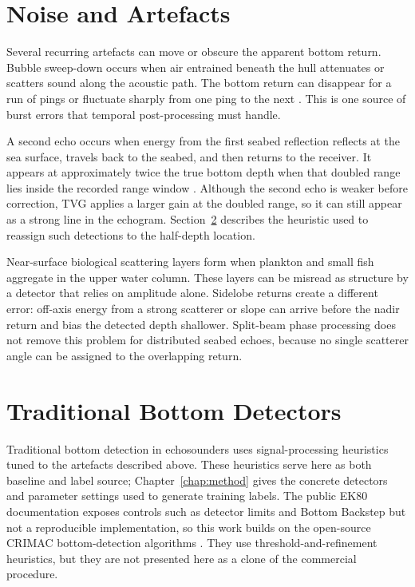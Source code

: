 \section{Noise and Artefacts}
\label{sec:artefacts}

Several recurring artefacts can move or obscure the apparent bottom return. Bubble sweep-down occurs when air entrained beneath the hull attenuates or scatters sound along the acoustic path. The bottom return can disappear for a run of pings or fluctuate sharply from one ping to the next \cite{delacroix_bubble_2016}. This is one source of burst errors that temporal post-processing must handle.

A second echo occurs when energy from the first seabed reflection reflects at the sea surface, travels back to the seabed, and then returns to the receiver. It appears at approximately twice the true bottom depth when that doubled range lies inside the recorded range window \cite{xiong_false_2024}. Although the second echo is weaker before correction, TVG applies a larger gain at the doubled range, so it can still appear as a strong line in the echogram. Section~\ref{sec:traditional_bottom_detection} describes the heuristic used to reassign such detections to the half-depth location.

Near-surface biological scattering layers form when plankton and small fish aggregate in the upper water column. These layers can be misread as structure by a detector that relies on amplitude alone. Sidelobe returns create a different error: off-axis energy from a strong scatterer or slope can arrive before the nadir return and bias the detected depth shallower. Split-beam phase processing does not remove this problem for distributed seabed echoes, because no single scatterer angle can be assigned to the overlapping return.

\section{Traditional Bottom Detectors}
\label{sec:traditional_bottom_detection}

Traditional bottom detection in echosounders uses signal-processing heuristics tuned to the artefacts described above. These heuristics serve here as both baseline and label source; Chapter~\ref{chap:method} gives the concrete detectors and parameter settings used to generate training labels. The public EK80 documentation exposes controls such as detector limits and Bottom Backstep but not a reproducible implementation, so this work builds on the open-source CRIMAC bottom-detection algorithms \cite{simrad_ek80_reference_2025,crimac_classifiers_bottom}. They use threshold-and-refinement heuristics, but they are not presented here as a clone of the commercial procedure.

